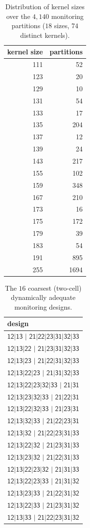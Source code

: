 \documentclass[11pt,a4paper]{article}
\theoremstyle{plain}
\theoremstyle{definition}
\theoremstyle{remark}
\newcommand{\st}[1]{\mathsf{#1}}
\begin{document}
\begin{table}[H]
\centering\small
\caption{Distribution of kernel sizes over the $4{,}140$ monitoring partitions ($18$ sizes, $74$ distinct kernels).}
\label{tab:design_sizes}
\begin{tabular}{rr}
\toprule
kernel size & partitions \\
\midrule
111 & 52 \\
123 & 20 \\
129 & 10 \\
131 & 54 \\
133 & 17 \\
135 & 204 \\
137 & 12 \\
139 & 24 \\
143 & 217 \\
155 & 102 \\
159 & 348 \\
167 & 210 \\
173 & 16 \\
175 & 172 \\
179 & 39 \\
183 & 54 \\
191 & 895 \\
255 & 1694 \\
\bottomrule
\end{tabular}
\end{table}
\begin{table}[H]
\centering\footnotesize
\caption{The $16$ coarsest (two-cell) dynamically adequate monitoring designs.}
\label{tab:coarsest}
\begin{tabular}{l}
\toprule
design \\
\midrule
$\st{12|13}$ $\mid$ $\st{21|22|23|31|32|33}$ \\
$\st{12|13|22}$ $\mid$ $\st{21|23|31|32|33}$ \\
$\st{12|13|23}$ $\mid$ $\st{21|22|31|32|33}$ \\
$\st{12|13|22|23}$ $\mid$ $\st{21|31|32|33}$ \\
$\st{12|13|22|23|32|33}$ $\mid$ $\st{21|31}$ \\
$\st{12|13|23|32|33}$ $\mid$ $\st{21|22|31}$ \\
$\st{12|13|22|32|33}$ $\mid$ $\st{21|23|31}$ \\
$\st{12|13|32|33}$ $\mid$ $\st{21|22|23|31}$ \\
$\st{12|13|32}$ $\mid$ $\st{21|22|23|31|33}$ \\
$\st{12|13|22|32}$ $\mid$ $\st{21|23|31|33}$ \\
$\st{12|13|23|32}$ $\mid$ $\st{21|22|31|33}$ \\
$\st{12|13|22|23|32}$ $\mid$ $\st{21|31|33}$ \\
$\st{12|13|22|23|33}$ $\mid$ $\st{21|31|32}$ \\
$\st{12|13|23|33}$ $\mid$ $\st{21|22|31|32}$ \\
$\st{12|13|22|33}$ $\mid$ $\st{21|23|31|32}$ \\
$\st{12|13|33}$ $\mid$ $\st{21|22|23|31|32}$ \\
\bottomrule
\end{tabular}
\end{table}
\end{document}
